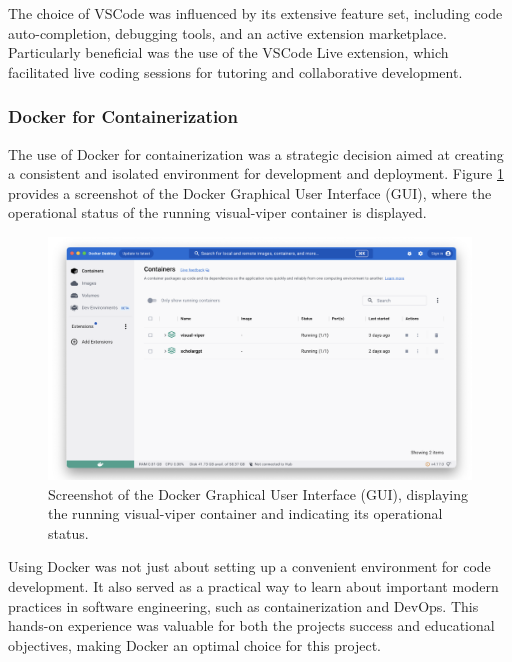 The choice of VSCode was influenced by its extensive feature set,
including code auto-completion, debugging tools, and an active extension
marketplace. Particularly beneficial was the use of the VSCode Live
extension, which facilitated live coding sessions for tutoring and
collaborative development.

\subsubsection{Docker for
Containerization}\label{docker-for-containerization}

The use of Docker for containerization was a strategic decision aimed at
creating a consistent and isolated environment for development and
deployment. Figure \ref{fig:docker} provides a screenshot of the Docker Graphical User
Interface (GUI), where the operational status of the running
\textquotesingle visual-viper\textquotesingle{} container is displayed.

\begin{figure}[ht]
  \centering
  \includegraphics[width=\textwidth]{media/fig3.png}
  \caption{Screenshot of the Docker Graphical User Interface (GUI),
  displaying the running \textquotesingle visual-viper\textquotesingle{}
  container and indicating its operational status.}
  \label{fig:docker}
\end{figure}


Using Docker was not just about setting up a convenient environment for
code development. It also served as a practical way to learn about
important modern practices in software engineering, such as
containerization and DevOps. This hands-on experience was valuable for
both the project\textquotesingle s success and educational objectives,
making Docker an optimal choice for this project.

